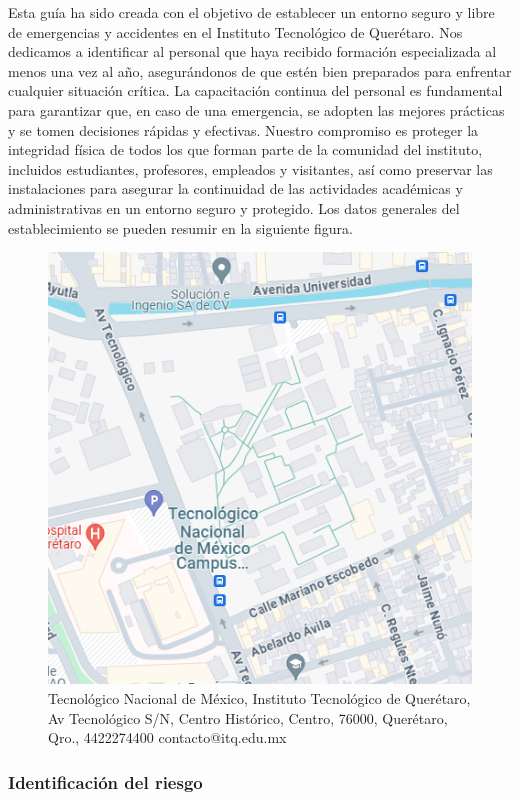     Esta guía ha sido creada con el objetivo de establecer un entorno seguro y libre de emergencias y accidentes en el Instituto Tecnológico de Querétaro. Nos dedicamos a identificar al personal que haya recibido formación especializada al menos una vez al año, asegurándonos de que estén bien preparados para enfrentar cualquier situación crítica. La capacitación continua del personal es fundamental para garantizar que, en caso de una emergencia, se adopten las mejores prácticas y se tomen decisiones rápidas y efectivas. Nuestro compromiso es proteger la integridad física de todos los que forman parte de la comunidad del instituto, incluidos estudiantes, profesores, empleados y visitantes, así como preservar las instalaciones para asegurar la continuidad de las actividades académicas y administrativas en un entorno seguro y protegido.
    Los datos generales del establecimiento se pueden resumir en la siguiente figura.
    \begin{figure}[H]
        \centering
        \includegraphics[scale=0.4]{35/Img/mapaITQ.png}
        \caption{Tecnológico Nacional de México, Instituto Tecnológico de Querétaro, Av Tecnológico S/N, Centro Histórico, Centro, 76000, Querétaro, Qro., 4422274400 contacto@itq.edu.mx}
        \label{fig:mapaITQ}
    \end{figure}
    
    \subsubsection{Identificación del riesgo}
    
